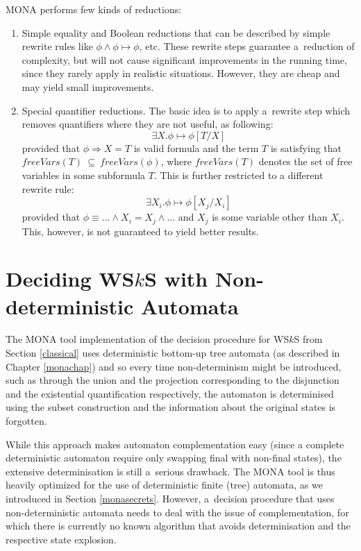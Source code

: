 MONA performs few kinds of reductions:
\begin{enumerate}
 \item Simple equality and Boolean reductions that can be described by simple
 rewrite rules like $\phi \wedge \phi \mapsto \phi$, etc. These rewrite
 steps guarantee a~reduction of complexity, but will not cause significant
 improvements in the running time, since they rarely apply in realistic
 situations. However, they are cheap and may yield small improvements.

\item Special quantifier reductions. The basic idea is to apply a~rewrite step
which removes quantifiers where they are not useful, as following:
\begin{equation}\exists X . \phi \mapsto \phi[T/X]
\end{equation}
provided that $\phi \Rightarrow X = T$ is valid formula and the term $T$ is
satisfying that $\mathit{freeVars}(T)~\subseteq~\mathit{freeVars}(\phi)$, where
$\mathit{freeVars}(T)$ denotes the set of free variables in some subformula $T$.
This is further restricted to a different rewrite rule: \begin{equation} \exists
X_i .\phi \mapsto \phi[X_j/X_i]
\end{equation} provided that $\phi \equiv
\ldots \wedge X_i = X_j \wedge \ldots$ and $X_j$ is some variable other than
$X_i$. This, however, is not guaranteed to yield better results.
\end{enumerate}

 \chapter{Deciding WS$k$S with Non-deterministic Automata}\label{our}

The \textsc{MONA} tool implementation of the decision procedure for WS$k$S from
Section \ref{classical} uses deterministic bottom-up tree automata (as described
in Chapter \ref{monachap}) and so every time non-determinism might be
introduced, such as through the union and the projection corresponding to
the disjunction and the existential quantification respectively, the automaton
is determinised using the subset construction and the information about the original states is forgotten.

While this approach makes automaton complementation easy (since
a complete deterministic automaton require only swapping final with non-final
states), the extensive determinisation is still a~serious drawback. The \textsc{MONA} tool is
thus heavily optimized for the use of deterministic finite (tree)
automata, as we introduced in Section \ref{monasecrets}. However, a~decision
procedure that uses non-deterministic automata needs to deal with the issue of
complementation, for which there is currently no known algorithm that avoids
determinisation and the respective state explosion.

